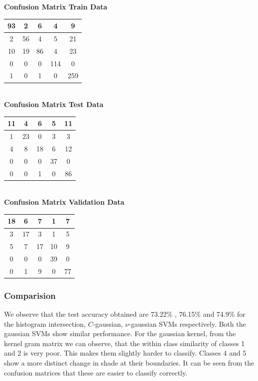 \documentclass{article}
\begin{document}
\begin{flushleft}
\textbf{Confusion Matrix Train Data\\[5pt]}
\begin{tabular}{|c|c|c|c|c|}
\hline
93 & 2 & 6 & 4 & 9 \\
\hline
2 & 56 & 4 & 5 & 21 \\
\hline
10 & 19 & 86 & 4 & 23\\
\hline
0 & 0 & 0 & 114 & 0\\
\hline
1 & 0 & 1 & 0 & 259 \\
\hline
\end{tabular}
\textbf{\\[10pt] Confusion Matrix Test Data \\[5pt]}
\begin{tabular}{|c|c|c|c|c|}
\hline
11 & 4 & 6 & 5 & 11\\
\hline
1 & 23 & 0 & 3 & 3 \\
\hline
4 & 8 & 18 & 6 & 12 \\
\hline
0 & 0 & 0 & 37 & 0 \\
\hline
0 & 0 & 1 & 0 & 86 \\
\hline
\end{tabular}
\textbf{\\[10pt] Confusion Matrix Validation Data \\[5pt]}
\begin{tabular}{|c|c|c|c|c|}
\hline
18 & 6 & 7 & 1 & 7 \\
\hline
3 & 17 & 3 & 1 & 5 \\
\hline
5 & 7 & 17 & 10 & 9 \\
\hline
0 & 0 & 0 & 39 & 0 \\
\hline
0 & 1 & 9 & 0 & 77 \\
\hline
\end{tabular}
\end{flushleft}




\subsubsection{Comparision}
We observe that the test accuracy obtained are 73.22\% , 76.15\% and 74.9\% for the histogram intersection, $C$-gaussian, $\nu$-gaussian SVMs respectively. Both the gaussian SVMs show similar performance. For the gaussian kernel, from the kernel gram matrix we can observe, that the within class similarity of classes 1 and 2 is very poor. This makes them slightly harder to classify. Classes 4 and 5 show a more distinct change in shade at their boundaries. It can be seen from the confusion matrices that these are easier to classify correctly.
\end{document}
